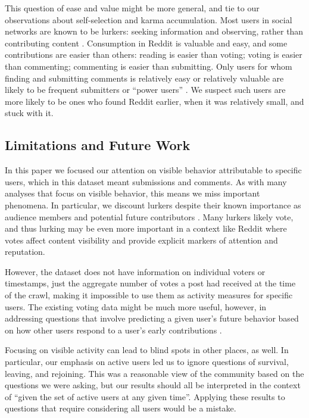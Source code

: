 This question of ease and value might be more general, and tie to our observations about self-selection and karma accumulation.  Most users in social networks are known to be lurkers: seeking information and observing, rather than contributing content \cite{Rafaeli2004, Nonnecke2000}. Consumption in Reddit is valuable and easy, and some contributions are easier than others: reading is easier than voting; voting is easier than commenting; commenting is easier than submitting.  Only users for whom finding and submitting comments is relatively easy or relatively valuable are likely to be frequent submitters or ``power users'' \cite{Panciera2009, Kittur2007}. We suspect such users are more likely to be ones who found Reddit earlier, when it was relatively small, and stuck with it.

\subsection{Limitations and Future Work}

In this paper we focused our attention on visible behavior attributable to specific users, which in this dataset meant submissions and comments.  As with many analyses that focus on visible behavior, this means we miss important phenomena.  In particular, we discount lurkers despite their known importance as audience members \cite{Nonnecke2003} and potential future contributors \cite{Ridings2006}.  Many lurkers likely vote, and thus lurking may be even more important in a context like Reddit where votes affect content visibility and provide explicit markers of attention and reputation.  

However, the dataset does not have information on individual voters or timestamps, just the aggregate number of votes a post had received at the time of the crawl, making it impossible to use them as activity measures for specific users.  The existing voting data might be much more useful, however, in addressing questions that involve predicting a given user's future behavior based on how other users respond to a user's early contributions \cite{Joyce2006,Sarkar2012}.


Focusing on visible activity can lead to blind spots in other places, as well.  In particular, our emphasis on active users led us to ignore questions of survival, leaving, and rejoining.  This was a reasonable view of the community based on the questions we were asking, but our results should all be interpreted in the context of ``given the set of active users at any given time''.  Applying these results to questions that require considering all users would be a mistake.  

